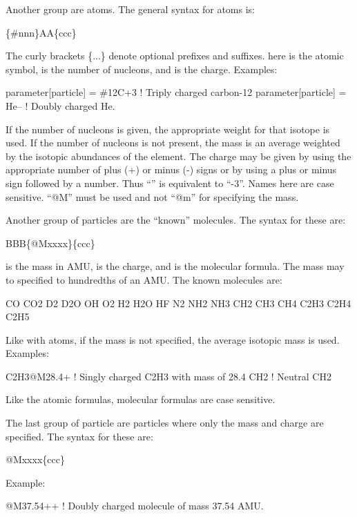 {{{{{Another group are atoms. The general syntax for atoms is:
\begin{example}
  \{\#nnn\}AA\{ccc\}
\end{example}
The curly brackets \{...\} denote optional prefixes and suffixes.  here is the
atomic symbol,  is the number of nucleons, and  is the charge. Examples:
\begin{example}
  parameter[particle] = \#12C+3       ! Triply charged carbon-12
  parameter[particle] = He--          ! Doubly charged He.
\end{example}
If the number of nucleons is given, the appropriate weight for that isotope is used. If the number
of nucleons is not present, the mass is an average weighted by the isotopic abundances of the
element. The charge may be given by using the appropriate number of plus (+) or minus (-) signs or
by using a plus or minus sign followed by a number. Thus ``\vn{-{-}-}'' is equivalent to
``-3''. Names here are case sensitive. ``@M'' must be used and not ``@m'' for specifying the mass.

Another group of particles are the ``known'' molecules. The syntax for these are:
\begin{example}
  BBB\{@Mxxxx\}\{ccc\}
\end{example}
 is the mass in AMU,  is the charge, and  is the molecular formula. The
mass may to specified to hundredths of an AMU. The known molecules are:
\begin{example}
  CO       CO2      
  D2       D2O      
  OH       O2      
  H2       H2O      HF
  N2       NH2      NH3      
  CH2      CH3      CH4      
  C2H3     C2H4     C2H5
\end{example}
Like with atoms, if the mass is not specified, the average isotopic mass is used. Examples:
\begin{example}
  C2H3@M28.4+     ! Singly charged C2H3 with mass of 28.4
  CH2             ! Neutral CH2
\end{example}
Like the atomic formulas, molecular formulas are case sensitive.

The last group of particle are particles where only the mass and charge are specified.  The syntax
for these are:
\begin{example}
  @Mxxxx\{ccc\}
\end{example}
Example:
\begin{example}
  @M37.54++    ! Doubly charged molecule of mass 37.54 AMU.
\end{example}

}}}}}
